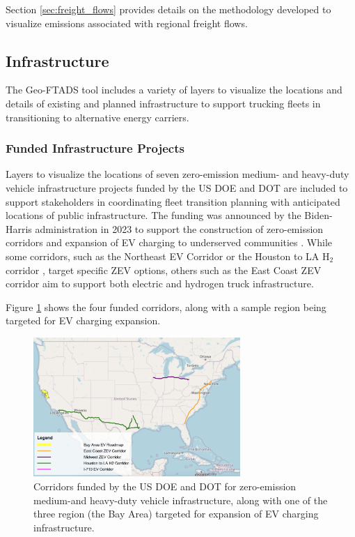 Section \ref{sec:freight_flows} provides details on the methodology developed to visualize emissions associated with regional freight flows. 

\subsection{Infrastructure}

The Geo-FTADS tool includes a variety of layers to visualize the locations and details of existing and planned infrastructure to support trucking fleets in transitioning to alternative energy carriers. 

\subsubsection{Funded Infrastructure Projects}

Layers to visualize the locations of seven zero-emission medium- and heavy-duty vehicle infrastructure projects funded by the US DOE and DOT are included to support stakeholders in coordinating fleet transition planning with anticipated locations of public infrastructure. The funding was announced by the Biden-Harris administration in 2023 to support the construction of zero-emission corridors and expansion of EV charging to underserved communities \cite{biden_harris_2023}. While some corridors, such as the Northeast EV Corridor \cite{NationalGridEVHighway} or the Houston to LA H$_2$ corridor \cite{H2LAAACOG2024}, target specific ZEV options, others such as the East Coast ZEV corridor \cite{CalstartZEVCorridor} aim to support both electric and hydrogen truck infrastructure. 

Figure \ref{fig:infra_projects} shows the four funded corridors, along with a sample region being targeted for EV charging expansion. 

\begin{figure}[ht]
        \centering
        \includegraphics[width=0.7\textwidth]{figures/infra_projects.png}
        \caption{Corridors funded by the US DOE and DOT for zero-emission medium-and heavy-duty vehicle infrastructure, along with one of the three region (the Bay Area) targeted for expansion of EV charging infrastructure. }
        \label{fig:infra_projects}
\end{figure}

